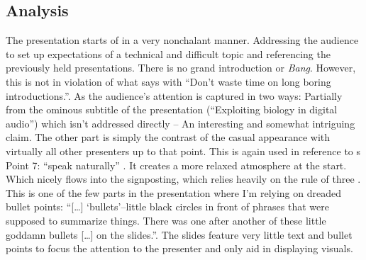\subsection{Analysis}


The presentation starts of in a very nonchalant manner.
Addressing the audience to set up expectations of a technical and difficult topic and referencing the previously held presentations.
There is no grand introduction or \textit{Bang}.
However, this is not in violation of what \citeauthor{powell2011presenting} says with \enquote{Don't waste time on long boring introductions.}\autocite[Point 3 on Page 7]{powell2011presenting}.
As the audience's attention is captured in two ways:
Partially from the ominous subtitle of the presentation (\enquote{Exploiting biology in digital audio}) which isn't addressed directly -- An interesting and somewhat intriguing claim.
The other part is simply the contrast of the casual appearance with virtually all other presenters up to that point.
This is again used in reference to \citeauthor{powell2011presenting}s Point 7: \enquote{speak naturally} \autocite[Page 7]{powell2011presenting}.
It creates a more relaxed atmosphere at the start.
Which nicely flows into the signposting, which relies heavily on the rule of three \autocite[Page 59, A]{williams2008presentations}.
This is one of the few parts in the presentation where I'm relying on dreaded bullet points:
\enquote{[\ldots] \enquote{bullets}--little black circles in front of phrases that were supposed to summarize things.
There was one after another of these little goddamn bullets [\ldots] on the slides.}\autocite[Page 126--127]{Feynman}.
The slides feature very little text and bullet points to focus the attention to the presenter and only aid in displaying visuals.

